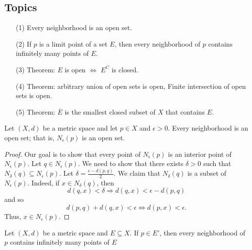 \documentclass[a4paper]{report}
\begin{document}
\subsection{Topics}

\begin{enumerate}
    \item[(1)] Every neighborhood is an open set.
    \item[(2)] If \( p  \) is a limit point of a set \( E  \), then every neighborhood of \( p  \) contains infinitely many points of \( E  \). 
    \item[(3)] Theorem: \( E  \) is open \( \Longleftrightarrow \) \( E^{C}   \) is closed.
    \item[(4)] Theorem: arbitrary union of open sets is open, Finite intersection of open sets is open.
    \item[(5)] Theorem: \( \overline{E} \) is the smallest closed subset of \( X  \) that contains \( E  \).
\end{enumerate}

\begin{theorem}[ ]
   Let \( (X,d) \) be a metric space and let \( p \in X  \) and \( \epsilon > 0  \). Every neighborhood is an open set; that is, \( {N}_{\epsilon}(p) \) is an open set.
\end{theorem}

\begin{proof}
Our goal is to show that every point of \( {N}_{\epsilon}(p) \) is an interior point of \( {N}_{\epsilon}(p) \). Let \( q \in {N}_{\epsilon}(p) \). We need to show that there exists \( \delta > 0  \) such that \( {N}_{\delta}(q) \subseteq {N}_{\epsilon}(p) \). Let \( \delta = \frac{ \epsilon - d(p,q)  }{ 2 }  \). We claim that \( {N}_{\delta}(q) \) is a subset of \( {N}_{\epsilon}(p) \). Indeed, if \( x \in {N}_{\delta}(q) \), then  
\[  d(q,x) < \delta \Longrightarrow d(q,x) < \epsilon - d(p,q)  \]
and so
\[  d(p,q) + d(q,x) < \epsilon \Longleftrightarrow d(p,x) < \epsilon \tag{triangle inequality}. \]
Thus, \( x \in {N}_{\epsilon}(p) \).

\end{proof}

\begin{theorem}[ ]
    Let \( (X,d) \) be a metric space and \( E \subseteq X  \). If \( p \in E' \), then every neighborhood of \( p  \) contains infinitely many points of \( E  \)
\end{theorem}
\end{document}
